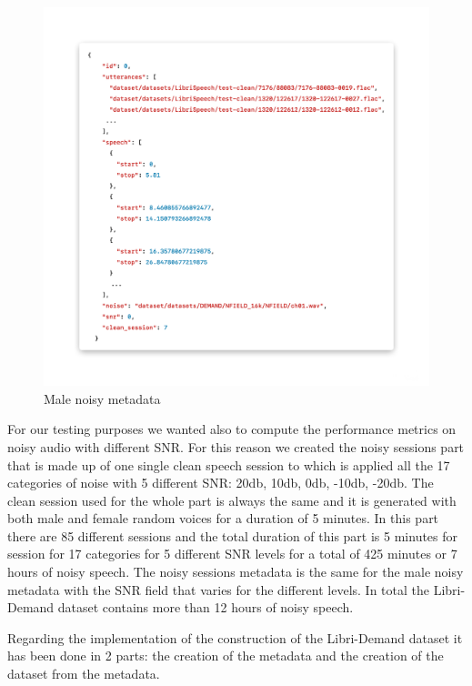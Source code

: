 \documentclass[../main.tex]{subfiles}
\begin{document}
\begin{figure}[ht]
    \centering
    \includegraphics[width=\textwidth]{images/session_noisy.png}
    \caption{Male noisy metadata}
    \label{fig:session_noisy}
\end{figure}

For our testing purposes we wanted also to compute the performance metrics on noisy audio with different SNR. For this reason we created the noisy sessions part that is made up of one single clean speech session to which is applied all the 17 categories of noise with 5 different SNR: 20db, 10db, 0db, -10db, -20db. The clean session used for the whole part is always the same and it is generated with both male and female random voices for a duration of 5 minutes. In this part there are 85 different sessions and the total duration of this part is 5 minutes for session for 17 categories for 5 different SNR levels for a total of 425 minutes or 7 hours of noisy speech. The noisy sessions metadata is the same for the male noisy metadata with the SNR field that varies for the different levels. In total the Libri-Demand dataset contains more than 12 hours of noisy speech.

Regarding the implementation of the construction of the Libri-Demand dataset it has been done in 2 parts: the creation of the metadata and the creation of the dataset from the metadata. 
\end{document}
